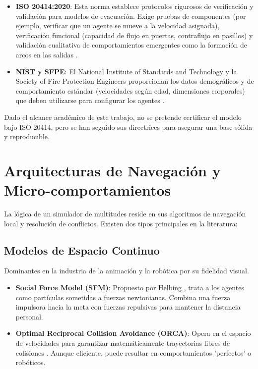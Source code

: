 \documentclass[11pt,spanish,listoffigures,listoftables]{tfgetsinf}
\begin{document}
\begin{itemize}
    \item \textbf{ISO 20414:2020}: Esta norma establece protocolos rigurosos de verificación y validación para modelos de evacuación. Exige pruebas de componentes (por ejemplo, verificar que un agente se mueve a la velocidad asignada), verificación funcional (capacidad de flujo en puertas, contraflujo en pasillos) y validación cualitativa de comportamientos emergentes como la formación de arcos en las salidas \cite{unknown-author-no-dateB}.
    \item \textbf{NIST y SFPE}: El National Institute of Standards and Technology y la Society of Fire Protection Engineers proporcionan los datos demográficos y de comportamiento estándar (velocidades según edad, dimensiones corporales) que deben utilizarse para configurar los agentes \cite{unknown-author-no-dateC}.
\end{itemize}

Dado el alcance académico de este trabajo, no se pretende certificar el modelo bajo ISO 20414, pero se han seguido sus directrices para asegurar una base sólida y reproducible.

\section{Arquitecturas de Navegación y Micro-comportamientos}

La lógica de un simulador de multitudes reside en sus algoritmos de navegación local y resolución de conflictos. Existen dos tipos principales en la literatura:

\subsection{Modelos de Espacio Continuo}
Dominantes en la industria de la animación y la robótica por su fidelidad visual.
\begin{itemize}
    \item \textbf{Social Force Model (SFM)}: Propuesto por Helbing \cite{helbing-1995}, trata a los agentes como partículas sometidas a fuerzas newtonianas. Combina una fuerza impulsora hacia la meta con fuerzas repulsivas para mantener la distancia personal.
    \item \textbf{Optimal Reciprocal Collision Avoidance (ORCA)}: Opera en el espacio de velocidades para garantizar matemáticamente trayectorias libres de colisiones \cite{van-den-berg-no-date}. Aunque eficiente, puede resultar en comportamientos 'perfectos' o robóticos.
\end{itemize}
\end{document}
